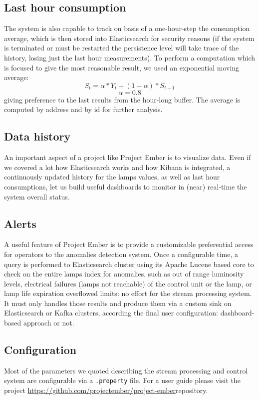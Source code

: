 \subsection*{Last hour consumption}
The system is also capable to track on basis of a one-hour-step the consumption average, which is then stored into Elasticsearch for security reasons (if the system is terminated or must be restarted the persistence level will take trace of the history, losing just the last hour measurements). To perform a computation which is focused to give the most reasonable result, we used an exponential moving average:
$$S_t = \alpha*Y_t + (1 - \alpha)*S_{t-1}$$
$$\alpha = 0.8$$
giving preference to the last results from the hour-long buffer. The average is computed by address and by id for further analysis.
\subsection*{Data history}
An important aspect of a project like Project Ember is to visualize data. Even if we covered a lot how Elasticsearch works and how Kibana is integrated, a continuously updated history for the lamps values, as well as last hour consumptions, let us build useful dashboards to monitor in (near) real-time the system overall status.

\subsection{Alerts}
A useful feature of Project Ember is to provide a customizable preferential access for operators to the anomalies detection system. Once a configurable time, a query is performed to Elasticsearch cluster using its Apache Lucene based core to check on the entire lamps index for anomalies, such as out of range luminosity levels, electrical failures (lamps not reachable) of the control unit or the lamp, or lamp life expiration overflowed limits: no effort for the stream processing system. It must only handles those results and produce them via a custom sink on Elasticsearch or Kafka clusters, according the final user configuration: dashboard-based approach or not.

\subsection{Configuration}
Most of the parameters we quoted describing the stream processing and control system are configurable via a \texttt{.property} file. For a user guide please visit the project \url{https://github.com/projectember/project-ember}{repository}.

